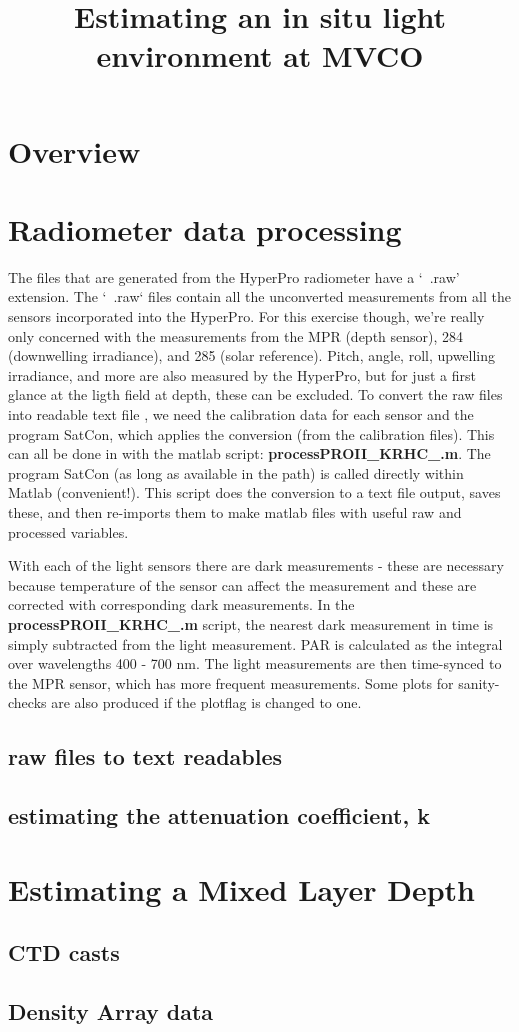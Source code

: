 \documentclass[11pt]{article}
\title{Estimating an in situ light environment at MVCO}
\begin{document}
\maketitle
\section{Overview}
\section{Radiometer data processing}

The files that are generated from the HyperPro radiometer have a `~.raw' extension. The `~.raw` files contain all the unconverted measurements from all the sensors incorporated into the HyperPro. For this exercise though, we're really only concerned with the measurements from the MPR (depth sensor), 284 (downwelling irradiance), and 285 (solar reference). Pitch, angle, roll, upwelling irradiance, and more are also measured by the HyperPro, but for just a first glance at the ligth field at depth, these can be excluded. To convert the raw files into readable text file , we need the calibration data for each sensor and the program SatCon, which applies the conversion (from the calibration files). This can all be done in with the matlab script: \textbf{processPROII\_KRHC\_.m}. The program SatCon (as long as available in the path) is called directly within Matlab (convenient!). This script does the conversion to a text file output, saves these, and then re-imports them to make matlab files with useful raw and processed variables.

With each of the light sensors there are dark measurements - these are necessary because temperature of the sensor can affect the measurement and these are corrected with corresponding dark measurements. In the \textbf{processPROII\_KRHC\_.m} script, the nearest dark measurement in time is simply subtracted from the light measurement. PAR is calculated as the integral over wavelengths 400 - 700 nm. The light measurements are then time-synced to the MPR sensor, which has more frequent measurements. Some plots for sanity-checks are also produced if the plotflag is changed to one.


\subsection{raw files to text readables}
\subsection{estimating the attenuation coefficient, k}
\section{Estimating a Mixed Layer Depth}
\subsection{CTD casts}
\subsection{Density Array data}
\end{document}
